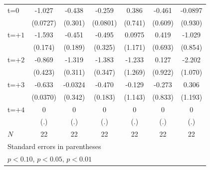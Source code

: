 \begin{table}[htbp]
\begin{tabular}{l*{6}{c}}
\addlinespace
t=0         &      -1.027\sym{***}&      -0.438         &      -0.259\sym{*}  &       0.386         &      -0.461         &     -0.0897         \\
            &    (0.0727)         &     (0.301)         &    (0.0801)         &     (0.741)         &     (0.609)         &     (0.930)         \\
\addlinespace
t=$+1$      &      -1.593\sym{**} &      -0.451         &      -0.495         &      0.0975         &       0.419         &      -1.029         \\
            &     (0.174)         &     (0.189)         &     (0.325)         &     (1.171)         &     (0.693)         &     (0.854)         \\
\addlinespace
t=$+2$      &      -0.869         &      -1.319\sym{*}  &      -1.383\sym{*}  &      -1.233         &       0.127         &      -2.202         \\
            &     (0.423)         &     (0.311)         &     (0.347)         &     (1.269)         &     (0.922)         &     (1.070)         \\
\addlinespace
t=$+3$      &      -0.633\sym{***}&     -0.0324         &      -0.470         &      -0.129         &      -0.273         &       0.306         \\
            &    (0.0370)         &     (0.342)         &     (0.183)         &     (1.143)         &     (0.833)         &     (1.193)         \\
\addlinespace
t=$+4$      &           0         &           0         &           0         &           0         &           0         &           0         \\
            &         (.)         &         (.)         &         (.)         &         (.)         &         (.)         &         (.)         \\
\midrule
\(N\)       &          22         &          22         &          22         &          22         &          22         &          22         \\
\bottomrule
\multicolumn{7}{l}{\footnotesize Standard errors in parentheses}\\
\multicolumn{7}{l}{\footnotesize \sym{*} \(p<0.10\), \sym{**} \(p<0.05\), \sym{***} \(p<0.01\)}\\
\end{tabular}
\end{table}
